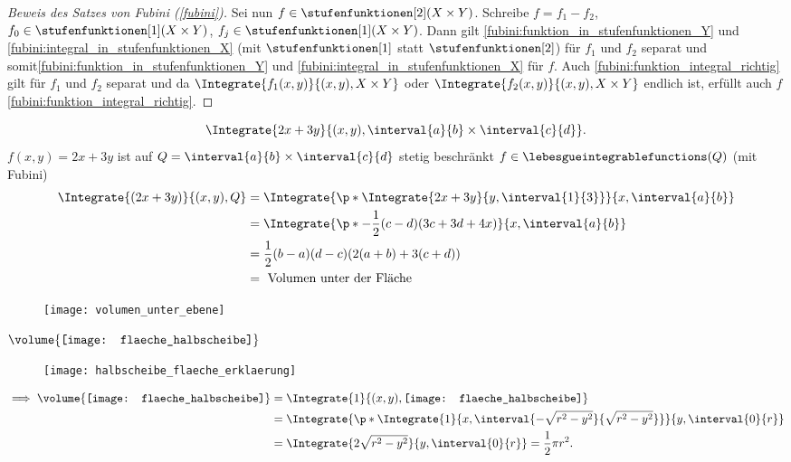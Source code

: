 \begin{proof}[Beweis des Satzes von Fubini (\ref{fubini})]
  Sei nun \( f\in \stufenfunktionen[2](X\times Y) \). Schreibe \( f=f_1-f_2 \), \( f_0\in \stufenfunktionen[1](X\times Y) \), \( f_j\in \stufenfunktionen[1](X\times Y) \). Dann gilt \ref{fubini:funktion_in_stufenfunktionen_Y} und \ref{fubini:integral_in_stufenfunktionen_X} (mit \( \stufenfunktionen[1] \) statt \( \stufenfunktionen[2] \)) für \( f_1 \) und \( f_2 \) separat und somit\ref{fubini:funktion_in_stufenfunktionen_Y} und \ref{fubini:integral_in_stufenfunktionen_X} für \( f \). Auch \ref{fubini:funktion_integral_richtig} gilt für \( f_1 \) und \( f_2 \) separat und da \( \Integrate{f_1(x,y)}{{(x,y)},X\times Y} \) oder \( \Integrate{f_2(x,y)}{{(x,y)},X\times Y} \) endlich ist, erfüllt auch \( f \) \ref{fubini:funktion_integral_richtig}.
\end{proof}
\begin{beispiel}
  \begin{equation*}
    \Integrate{2x+3y}{{(x,y)},\interval{a}{b}\times \interval{c}{d}}.
  \end{equation*}
  \( f(x,y)=2x+3y \) ist auf \( Q=\interval{a}{b}\times \interval{c}{d} \) stetig \timplies beschränkt \timplies \( f\in \lebesgueintegrablefunctions(Q) \) \timplies (mit Fubini)
  \begin{align*}
    \Integrate{(2x+3y)}{{(x,y)},Q}&=\Integrate{\p*{\Integrate{2x+3y}{y,\interval{1}{3}}}}{x,\interval{a}{b}}\\
    &=\Integrate{\p*{-\frac{1}{2}}(c-d)(3c+3d+4x)}{x,\interval{a}{b}}\\
    &=\frac{1}{2}(b-a)(d-c)(2(a+b)+3(c+d))\\
    &=\text{ Volumen unter der Fläche}
  \end{align*}
   \begin{figure}[H]
     \centering
     \texttt{[image: volumen\_unter\_ebene]}
     \label{fig:volumen_unter_ebene}
   \end{figure}
\end{beispiel}
\begin{beispiel*}
  \( \volume{\text{\texttt{[image: flaeche\_halbscheibe]}}} \)
  \begin{figure}[H]
    \centering
    \texttt{[image: halbscheibe\_flaeche\_erklaerung]}
    \label{fig:halbscheibe_flaeche_erklaerung}
  \end{figure}  
  \begin{align*}
    \implies \volume{\text{\texttt{[image: flaeche\_halbscheibe]}}}&=\Integrate{1}{{(x,y)},\text{\texttt{[image: flaeche\_halbscheibe]}}}\\
    &=\Integrate{\p*{\Integrate{1}{x,\interval{-\sqrt{r^2-y^2}}{\sqrt{r^2-y^2}}}}}{y,\interval{0}{r}}\\
    &=\Integrate{2\sqrt{r^2-y^2}}{y,\interval{0}{r}}=\frac{1}{2}\pi r^2.
  \end{align*}
\end{beispiel*}
